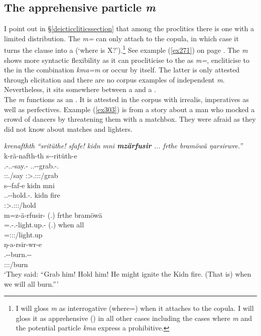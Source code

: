 \subsection{The apprehensive particle \emph{m}}\label{apprehensivem}

I point out in \S{}\ref{deicticcliticssection} that among the  proclitics there is one with a limited distribution. The \emph{m=}  can only attach to the copula, in which case it turns the clause into a  (`where is X?').\footnote{I will gloss \emph{m} as interrogative (where=) when it attaches to the copula. I will gloss it as apprehensive (\Appr) in all other cases including the cases where \emph{m} and the potential particle \emph{kma} express a prohibitive.} See example (\ref{ex271}) on page \pageref{ex271}. The \emph{m}  shows more syntactic flexibility as it can procliticise to the  as \emph{m=}, encliticise to the   in the combination \emph{kma=m} or occur by itself. The latter is only attested through elicitation and there are no corpus examples of independent \emph{m}. Nevertheless, it sits somewhere between a  and a .\\

The  \emph{m} functions as an . It is attested in the corpus with irrealis, imperatives as well as perfectives. Example (\ref{ex303}) is from a story about a man who mocked a crowd of dancers by threatening them with a matchbox. They were afraid as they did not know about matches and lighters.

\begin{exe}
	\ex \emph{krenafthth ``sritüthe! sfafe! kidn mni \textbf{mzärfusir} ... frthe bramöwä ŋarsirwre.''}\\
	\glll k-rä-nafth-th s-\Zero{}-ritüth-e\\
	\M.\Bet-\Irr.\Vc.\Ndu-say.\Rs-\Stnsg{} \Tsg.\Masc.\Bet-\Du-grab.\Rs-\Stnsg{}.\Imp{}\\
	\footnotesize{\Stpl:\Sbj:\Irr.\Pfv/say} \footnotesize{\Sdu:\Sbj>\Tsg.\Masc:\Obj:\Imp:\Pfv/grab}\\
	\sn
	\glll s-\Zero{}-faf-e kidn mni\\
	\Tsg.\Masc.\Bet-\Du-hold.\Rs-\Stnsg{}.\Imp{} kidn fire\\
	\footnotesize{\Sdu:\Sbj>\Tsg.\Masc:\Obj:\Imp:\Pfv/hold} {} {}\\
	\sn
	\glll m=z-ä-rfusir-\Zero{} (.) frthe bramöwä\\
	\Appr=\M.\Gam-\Vc.\Ndu-light.up.\Rs{}-\Stsg{} (.) when all\\
	\footnotesize{\Appr=\Stsg:\Sbj:\Rpst:\Pfv/light.up} {} {} {}\\
	\sn
	\glll ŋ-a-rsir-wr-e\\
	\M.\Alph-\Vc-burn.\Ext-\Ndu-\Fnsg{}\\
	\footnotesize{\Fpl:\Sbj:\Nonpast:\Ipfv/burn}\\
	\trans `They said: ``Grab him! Hold him! He might ignite the Kidn fire. (That is) when we will all burn.'''
	\label{ex303}
\end{exe}

